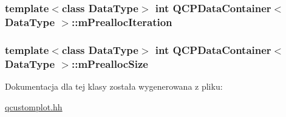 \subsubsection[{\texorpdfstring{m\+Prealloc\+Iteration}{mPreallocIteration}}]{\setlength{\rightskip}{0pt plus 5cm}template$<$class Data\+Type$>$ int {\bf Q\+C\+P\+Data\+Container}$<$ Data\+Type $>$\+::m\+Prealloc\+Iteration\hspace{0.3cm}{\ttfamily [protected]}}\hypertarget{class_q_c_p_data_container_ab2115bf023c29691f441eaf1889de84a}{}\label{class_q_c_p_data_container_ab2115bf023c29691f441eaf1889de84a}
\subsubsection[{\texorpdfstring{m\+Prealloc\+Size}{mPreallocSize}}]{\setlength{\rightskip}{0pt plus 5cm}template$<$class Data\+Type$>$ int {\bf Q\+C\+P\+Data\+Container}$<$ Data\+Type $>$\+::m\+Prealloc\+Size\hspace{0.3cm}{\ttfamily [protected]}}\hypertarget{class_q_c_p_data_container_a3554d3ad00e69f7ce057efa00ea6f4b2}{}\label{class_q_c_p_data_container_a3554d3ad00e69f7ce057efa00ea6f4b2}


Dokumentacja dla tej klasy została wygenerowana z pliku\+:\begin{DoxyCompactItemize}
\item 
\hyperlink{qcustomplot_8hh}{qcustomplot.\+hh}\end{DoxyCompactItemize}
